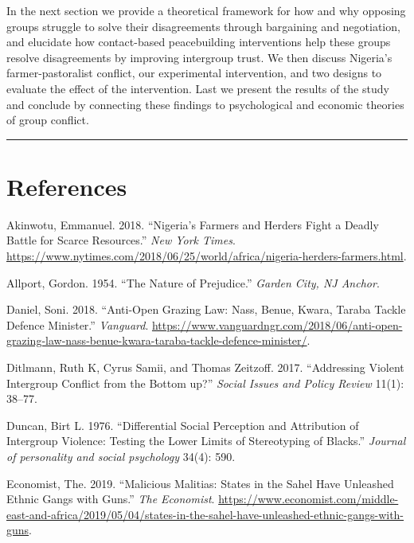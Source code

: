 \documentclass[11pt]{article}
\begin{document}
In the next section we provide a theoretical framework for how and why
opposing groups struggle to solve their disagreements through bargaining
and negotiation, and elucidate how contact-based peacebuilding
interventions help these groups resolve disagreements by improving
intergroup trust. We then discuss Nigeria's farmer-pastoralist conflict,
our experimental intervention, and two designs to evaluate the effect of
the intervention. Last we present the results of the study and conclude
by connecting these findings to psychological and economic theories of
group conflict.

\begin{center}\rule{0.5\linewidth}{\linethickness}\end{center}

\hypertarget{references}{%
\section*{References}\label{references}}

\hypertarget{refs}{}
\leavevmode\hypertarget{ref-nyt2018nigeria}{}%
Akinwotu, Emmanuel. 2018. ``Nigeria's Farmers and Herders Fight a Deadly
Battle for Scarce Resources.'' \emph{New York Times}.
\url{https://www.nytimes.com/2018/06/25/world/africa/nigeria-herders-farmers.html}.

\leavevmode\hypertarget{ref-allport1954prejudice}{}%
Allport, Gordon. 1954. ``The Nature of Prejudice.'' \emph{Garden City,
NJ Anchor}.

\leavevmode\hypertarget{ref-daniel2018anti}{}%
Daniel, Soni. 2018. ``Anti-Open Grazing Law: Nass, Benue, Kwara, Taraba
Tackle Defence Minister.'' \emph{Vanguard}.
\url{https://www.vanguardngr.com/2018/06/anti-open-grazing-law-nass-benue-kwara-taraba-tackle-defence-minister/}.

\leavevmode\hypertarget{ref-ditlmann2017addressing}{}%
Ditlmann, Ruth K, Cyrus Samii, and Thomas Zeitzoff. 2017. ``Addressing
Violent Intergroup Conflict from the Bottom up?'' \emph{Social Issues
and Policy Review} 11(1): 38--77.

\leavevmode\hypertarget{ref-duncan1976differential}{}%
Duncan, Birt L. 1976. ``Differential Social Perception and Attribution
of Intergroup Violence: Testing the Lower Limits of Stereotyping of
Blacks.'' \emph{Journal of personality and social psychology} 34(4):
590.

\leavevmode\hypertarget{ref-economist2019militias}{}%
Economist, The. 2019. ``Malicious Malitias: States in the Sahel Have
Unleashed Ethnic Gangs with Guns.'' \emph{The Economist}.
\url{https://www.economist.com/middle-east-and-africa/2019/05/04/states-in-the-sahel-have-unleashed-ethnic-gangs-with-guns}.
\end{document}

